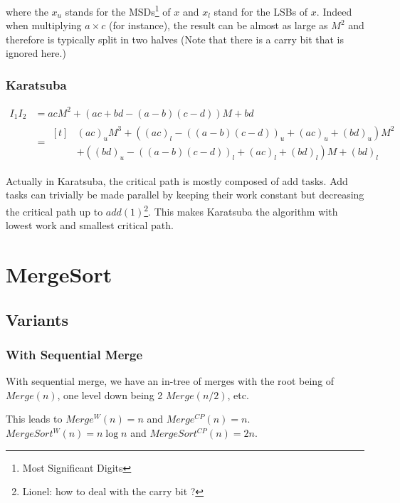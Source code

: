 \documentclass{article}
\begin{document}
where the $x_u$ stands for the MSDs\footnote{Most Significant Digits}
of $x$ and $x_l$ stand for the LSBs of $x$. Indeed when multiplying
$a\times c$ (for instance), the result can be almost as large as $M^2$
and therefore is typically split in two halves (Note that there is a
carry bit that is ignored here.)

\subsubsection{Karatsuba}

\begin{align}
  I_1  I_2 & = a c M^2 + (a  c + b  d -(a-b)(c-d) ) M + bd \\
            & = \begin{aligned}[t]& (a c)_{u} M^3 + ((a c)_{l} - ((a-b)(c-d))_{u} + (a  c)_u + (b  d)_u) M^2\\ & + ((b d)_{u} - ((a-b)(c-d))_{l} + (a  c)_l + (b  d)_l ) M + (b d)_{l}
  \end{aligned}
\end{align}



Actually in Karatsuba, the critical path is mostly composed of add
tasks. Add tasks can trivially be made parallel by keeping their work
constant but decreasing the critical path up to
$add(1)$\footnote{Lionel: how to deal with the carry bit ?}. This
makes Karatsuba the algorithm with lowest work and smallest critical
path.

\section{MergeSort}

\subsection{Variants}

\subsubsection{With Sequential Merge}

With sequential merge, we have an in-tree of merges with the root
being of $Merge(n)$, one level down being 2 $Merge(n/2)$, etc.

This leads to $Merge^W(n) = n$ and $Merge^{CP}(n)=n$. $MergeSort^W(n)
= n \log n$ and $MergeSort^{CP}(n) = 2n$.
\end{document}
